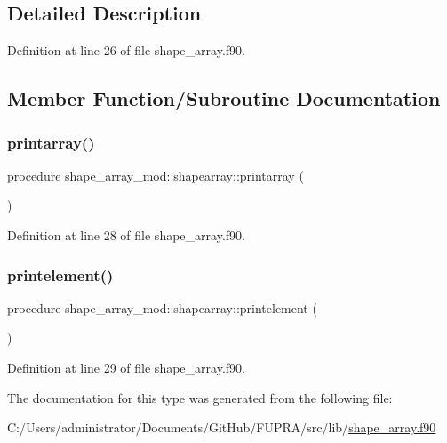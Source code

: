 \subsection{Detailed Description}


Definition at line 26 of file shape\+\_\+array.\+f90.



\subsection{Member Function/\+Subroutine Documentation}
\mbox{\label{structshape__array__mod_1_1shapearray_a3ee5328343a8ba2b26ee4e91385d009d}} 
\subsubsection{\texorpdfstring{printarray()}{printarray()}}
{\footnotesize\ttfamily procedure shape\+\_\+array\+\_\+mod\+::shapearray\+::printarray (\begin{DoxyParamCaption}{ }\end{DoxyParamCaption})\hspace{0.3cm}{\ttfamily [private]}}



Definition at line 28 of file shape\+\_\+array.\+f90.

\mbox{\label{structshape__array__mod_1_1shapearray_acd1aa17e088e5534c3d9373bd28a3921}} 
\subsubsection{\texorpdfstring{printelement()}{printelement()}}
{\footnotesize\ttfamily procedure shape\+\_\+array\+\_\+mod\+::shapearray\+::printelement (\begin{DoxyParamCaption}{ }\end{DoxyParamCaption})\hspace{0.3cm}{\ttfamily [private]}}



Definition at line 29 of file shape\+\_\+array.\+f90.



The documentation for this type was generated from the following file\+:\begin{DoxyCompactItemize}
\item 
C\+:/\+Users/administrator/\+Documents/\+Git\+Hub/\+F\+U\+P\+R\+A/src/lib/\hyperlink{shape__array_8f90}{shape\+\_\+array.\+f90}\end{DoxyCompactItemize}

